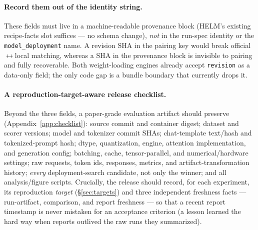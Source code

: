 \paragraph{Record them out of the identity string.} These fields must live in a
machine-readable provenance block (HELM's existing recipe-facts slot suffices ---
no schema change), \emph{not} in the run-spec identity or the
\texttt{model\_deployment} name. A revision SHA in the pairing key would break
official$\leftrightarrow$local matching, whereas a SHA in the provenance block is
invisible to pairing and fully recoverable. Both weight-loading engines already
accept \texttt{revision} as a data-only field; the only code gap is a bundle
boundary that currently drops it.

\paragraph{A reproduction-target-aware release checklist.} Beyond the three
fields, a paper-grade evaluation artifact should preserve (Appendix~\ref{app:checklist}):
source commit and container digest; dataset and scorer versions; model and
tokenizer commit SHAs; chat-template text/hash and tokenized-prompt hash; dtype,
quantization, engine, attention implementation, and generation config; batching,
cache, tensor-parallel, and numerical/hardware settings; raw requests, token ids,
responses, metrics, and artifact-transformation history; \emph{every}
deployment-search candidate, not only the winner; and all analysis/figure scripts.
Crucially, the release should record, for each experiment, its reproduction
\emph{target} (\S\ref{sec:targets}) and three independent freshness facts ---
run-artifact, comparison, and report freshness --- so that a recent report
timestamp is never mistaken for an acceptance criterion (a lesson learned the hard
way when reports outlived the raw runs they summarized).
